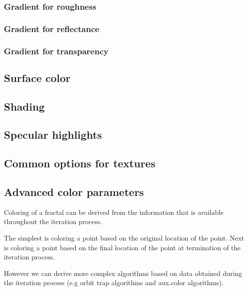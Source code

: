 \subsubsection{Gradient for roughness}\label{materials-roughness-gradient}

\subsubsection{Gradient for reflectance}\label{materials-reflectance-gradient}

\subsubsection{Gradient for transparency}\label{materials-transparency-gradient}

\subsection{Surface color}\label{materials-surface_color}

\subsection{Shading}\label{materials-shading}

\subsection{Specular highlights}\label{materials-specular}

\subsection{Common options for textures}\label{materials-textures}

\subsection{Advanced color parameters}\label{materials-advanced-color-parameters}

Coloring of a fractal can be derived from the information that is available throughout the iteration process.

The simplest is coloring a point based on the original location of the point.
Next is coloring a point based on the final location of the point at termination of the iteration process.

However we can derive more complex algorithms based on data obtained during the iteration process (e.g orbit trap algorithms and aux.color algorithms).

